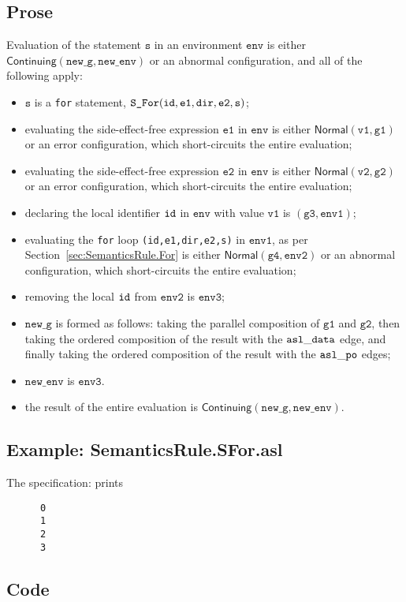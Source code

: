 \documentclass{book}
\newcommand\secref[1]{Section~\ref{sec:#1}}
\newcommand\ProseOrAbnormal[0]{or an abnormal configuration, which short-circuits the entire evaluation}
\newcommand\ProseOrError[0]{or an error configuration, which short-circuits the entire evaluation}
\newcommand\Normal[0]{\textsf{Normal}}
\newcommand\Continuing[0]{\textsf{Continuing}}
\newcommand\newenv[0]{\texttt{new\_env}}
\newcommand\env[0]{\texttt{env}}
\newcommand\envone[0]{\texttt{env1}}
\newcommand\envtwo[0]{\texttt{env2}}
\newcommand\envthree[0]{\texttt{env3}}
\newcommand\newg[0]{\texttt{new\_g}}
\newcommand\vs[0]{\texttt{s}}
\newcommand\vvone[0]{\texttt{v1}}
\newcommand\vvtwo[0]{\texttt{v2}}
\newcommand\veone[0]{\texttt{e1}}
\newcommand\vetwo[0]{\texttt{e2}}
\newcommand\vgone[0]{\texttt{g1}}
\newcommand\vgtwo[0]{\texttt{g2}}
\newcommand\vgthree[0]{\texttt{g3}}
\newcommand\vgfour[0]{\texttt{g4}}
\newcommand\dir[0]{\texttt{dir}}
\begin{document}
    \subsection{Prose}
    Evaluation of the statement $\vs$ in an environment $\env$ is
    either $\Continuing(\newg, \newenv)$ or an abnormal configuration,
    and all of the following apply:
    \begin{itemize}
    \item $\vs$ is a \texttt{for} statement, $\texttt{S\_For}(\id, \veone, \dir, \vetwo, \vs)$;
    \item evaluating the side-effect-free expression $\veone$ in $\env$ is either
    $\Normal(\vvone, \vgone)$ \ProseOrError;
    \item evaluating the side-effect-free expression $\vetwo$ in $\env$ is either
    $\Normal(\vvtwo, \vgtwo)$ \ProseOrError;
    \item declaring the local identifier $\texttt{id}$ in $\env$ with value $\vvone$ is $(\vgthree, \envone)$;
    \item evaluating the \texttt{for} loop \texttt{(id,e1,dir,e2,s)} in $\envone$,
    as per \secref{SemanticsRule.For} is either $\Normal(\vgfour, \envtwo)$ \ProseOrAbnormal;
    \item removing the local $\texttt{id}$ from $\envtwo$ is $\envthree$;
    \item $\newg$ is formed as follows: taking the parallel composition of $\vgone$ and $\vgtwo$,
    then taking the ordered composition of the result with the $\mathtt{asl\_data}$ edge,
    and finally taking the ordered composition of the result with the $\mathtt{asl\_po}$ edges;
    \item $\newenv$ is $\envthree$.
    \item the result of the entire evaluation is $\Continuing(\newg, \newenv)$.
    \end{itemize}

    \subsection{Example: SemanticsRule.SFor.asl}
    The specification:
    prints
    \begin{Verbatim}
      0
      1
      2
      3
    \end{Verbatim}

  \subsection{Code}
\end{document}
